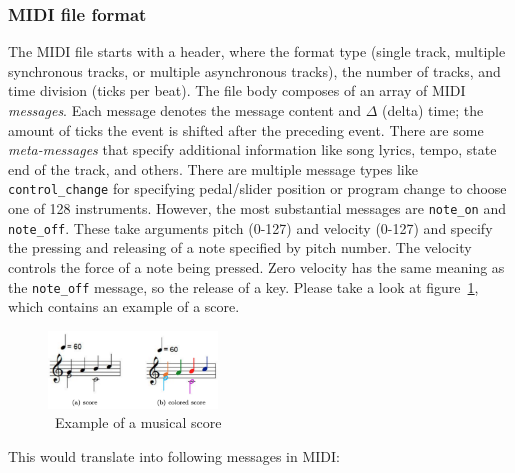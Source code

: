 \subsubsection{MIDI file format}\label{subsubsec:midi-file-format}

The MIDI file starts with a header, where the format type (single track, multiple synchronous tracks, or multiple asynchronous tracks), the number of tracks, and time division (ticks per beat).
The file body composes of an array of MIDI \textit{messages}.
Each message denotes the message content and $\Delta$ (delta) time;
the amount of ticks the event is shifted after the preceding event.
There are some \textit{meta-messages} that specify additional information like song lyrics, tempo, state end of the track, and others.
There are multiple message types like \texttt{control\_change} for specifying pedal/slider position or program change to choose one of 128 instruments.
However, the most substantial messages are \texttt{note\_on} and \texttt{note\_off}.
These take arguments pitch (0-127) and velocity (0-127) and specify the pressing and releasing of a note specified by pitch number.
The velocity controls the force of a note being pressed.
Zero velocity has the same meaning as the \texttt{note\_off} message, so the release of a key.
Please take a look at figure~\ref{fig:score-to-midi}, which contains an example of a score.~\cite{understanding-midi}

\begin{figure}
    \centering
    \includegraphics[width=0.4\textwidth]{assets/score-to-midi}
    \caption{~Example of a musical score~\cite{understanding-midi}}\label{fig:score-to-midi}
\end{figure}

This would translate into following messages in MIDI:

